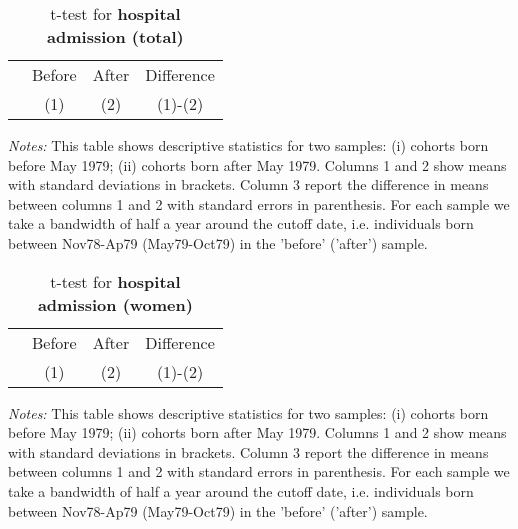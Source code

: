 \begin{table}[H] \centering 
	\begin{threeparttable} \centering \caption{t-test for \textbf{hospital admission (total)}}\label{tab:t-test_d5total}
		\begin{footnotesize}
			{\def\sym#1{\ifmmode^{#1}\else\(^{#1}\)\fi} 
				\begin{tabular}{l*{3}{c}}
					\toprule 
					& \multicolumn{1}{c}{Before} & \multicolumn{1}{c}{After} & \multicolumn{1}{c}{Difference} \\
					&\multicolumn{1}{c}{(1)}&\multicolumn{1}{c}{(2)}&\multicolumn{1}{c}{(1)-(2)}\\
					\midrule
					
					\bottomrule
			\end{tabular}}
		\end{footnotesize}
	\end{threeparttable} 
	\begin{minipage}{0.9\linewidth}
		\scriptsize \emph{Notes:} This table shows descriptive statistics for two samples: (i) cohorts born before May 1979; (ii) cohorts born after May 1979. Columns 1 and 2 show means with standard deviations in brackets. Column 3 report the difference in means between columns 1 and 2 with standard errors in parenthesis. For each sample we take a bandwidth of half a year around the cutoff date, i.e. individuals born between Nov78-Ap79 (May79-Oct79) in the 'before' ('after') sample.
	\end{minipage}
\end{table} 
\begin{table}[H] \centering 
	\begin{threeparttable} \centering \caption{t-test for \textbf{hospital admission (women)}}\label{tab:t-test_d5female}
		\begin{footnotesize}
			{\def\sym#1{\ifmmode^{#1}\else\(^{#1}\)\fi} 
				\begin{tabular}{l*{3}{c}}
					\toprule 
					& \multicolumn{1}{c}{Before} & \multicolumn{1}{c}{After} & \multicolumn{1}{c}{Difference} \\
					&\multicolumn{1}{c}{(1)}&\multicolumn{1}{c}{(2)}&\multicolumn{1}{c}{(1)-(2)}\\
					\midrule
					
					\bottomrule
			\end{tabular}}
		\end{footnotesize}
	\end{threeparttable} 
	\begin{minipage}{0.9\linewidth}
		\scriptsize \emph{Notes:} This table shows descriptive statistics for two samples: (i) cohorts born before May 1979; (ii) cohorts born after May 1979. Columns 1 and 2 show means with standard deviations in brackets. Column 3 report the difference in means between columns 1 and 2 with standard errors in parenthesis. For each sample we take a bandwidth of half a year around the cutoff date, i.e. individuals born between Nov78-Ap79 (May79-Oct79) in the 'before' ('after') sample.
	\end{minipage}
\end{table} 
